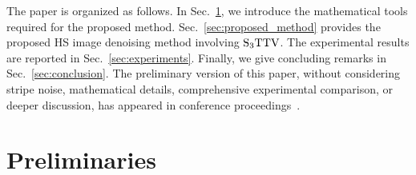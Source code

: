 \documentclass[10pt,journal]{IEEEtran}
\begin{document}
The paper is organized as follows.
In Sec.~\ref{sec:Preliminaries}, we introduce the mathematical tools required for the proposed method.
Sec.~\ref{sec:proposed_method} provides the proposed HS image denoising method involving ${\text{S}_{3} \text{TTV}}$.
The experimental results are reported in Sec.~\ref{sec:experiments}.
Finally, we give concluding remarks in Sec.~\ref{sec:conclusion}.
The preliminary version of this paper, without considering stripe noise, mathematical details, comprehensive experimental comparison, or deeper discussion, has appeared in conference proceedings~\cite{Takemoto2023S3TTV}.





\section{Preliminaries}
\label{sec:Preliminaries}
\end{document}
